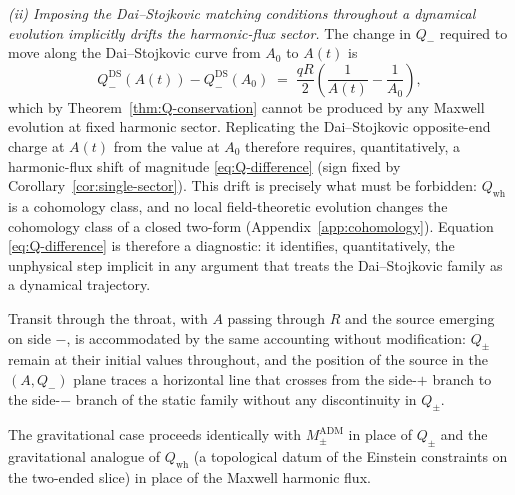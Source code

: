 \documentclass[aps,prd,onecolumn,nofootinbib,superscriptaddress]{revtex4-2}
\begin{document}
\emph{(ii) Imposing the Dai--Stojkovic matching conditions throughout a dynamical evolution implicitly drifts the harmonic-flux sector.} The change in $Q_-$ required to move along the Dai--Stojkovic curve from $A_0$ to $A(t)$ is
\begin{equation}
\label{eq:Q-difference}
Q_-^{\mathrm{DS}}(A(t)) - Q_-^{\mathrm{DS}}(A_0) \;=\; \frac{qR}{2}\!\left(\frac{1}{A(t)}-\frac{1}{A_0}\right),
\end{equation}
which by Theorem~\ref{thm:Q-conservation} cannot be produced by any Maxwell evolution at fixed harmonic sector. Replicating the Dai--Stojkovic opposite-end charge at $A(t)$ from the value at $A_0$ therefore requires, quantitatively, a harmonic-flux shift of magnitude \eqref{eq:Q-difference} (sign fixed by Corollary~\ref{cor:single-sector}). This drift is precisely what must be forbidden: $Q_{\mathrm{wh}}$ is a cohomology class, and no local field-theoretic evolution changes the cohomology class of a closed two-form (Appendix~\ref{app:cohomology}). Equation \eqref{eq:Q-difference} is therefore a diagnostic: it identifies, quantitatively, the unphysical step implicit in any argument that treats the Dai--Stojkovic family as a dynamical trajectory.

Transit through the throat, with $A$ passing through $R$ and the source emerging on side $-$, is accommodated by the same accounting without modification: $Q_\pm$ remain at their initial values throughout, and the position of the source in the $(A,Q_-)$ plane traces a horizontal line that crosses from the side-$+$ branch to the side-$-$ branch of the static family without any discontinuity in $Q_\pm$.

The gravitational case proceeds identically with $M^{\mathrm{ADM}}_\pm$ in place of $Q_\pm$ and the gravitational analogue of $Q_{\mathrm{wh}}$ (a topological datum of the Einstein constraints on the two-ended slice) in place of the Maxwell harmonic flux.



\end{document}
